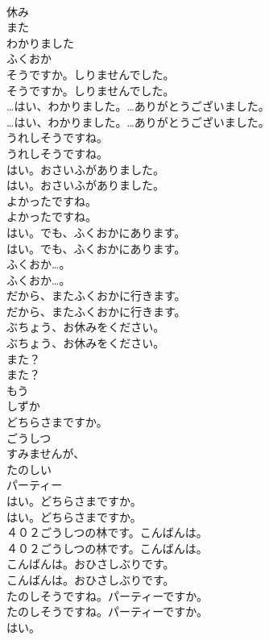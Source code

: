 \documentclass[8pt]{extreport}
\begin{document}
\begin{CJK}{UTF8}{min}
\\	休み
\\	また
\\	わかりました
\\	ふくおか
\\	そうですか。しりませんでした。	
\\	そうですか。しりませんでした。 
\\	…はい、わかりました。…ありがとうございました。	
\\	…はい、わかりました。…ありがとうございました。 
\\	うれしそうですね。	
\\	うれしそうですね。 
\\	はい。おさいふがありました。	
\\	はい。おさいふがありました。 
\\	よかったですね。	
\\	よかったですね。 
\\	はい。でも、ふくおかにあります。	
\\	はい。でも、ふくおかにあります。 
\\	ふくおか…。	
\\	ふくおか…。 
\\	だから、またふくおかに行きます。	
\\	だから、またふくおかに行きます。 
\\	ぶちょう、お休みをください。	
\\	ぶちょう、お休みをください。 
\\	また？	
\\	また？ 
\\	もう
\\	しずか
\\	どちらさまですか。
\\	ごうしつ
\\	すみませんが、
\\	たのしい
\\	パーティー
\\	はい。どちらさまですか。	
\\	はい。どちらさまですか。 
\\	４０２ごうしつの林です。こんばんは。	
\\	４０２ごうしつの林です。こんばんは。 
\\	こんばんは。おひさしぶりです。	
\\	こんばんは。おひさしぶりです。 
\\	たのしそうですね。パーティーですか。	
\\	たのしそうですね。パーティーですか。 
\\	はい。	

\end{CJK}
\end{document}
